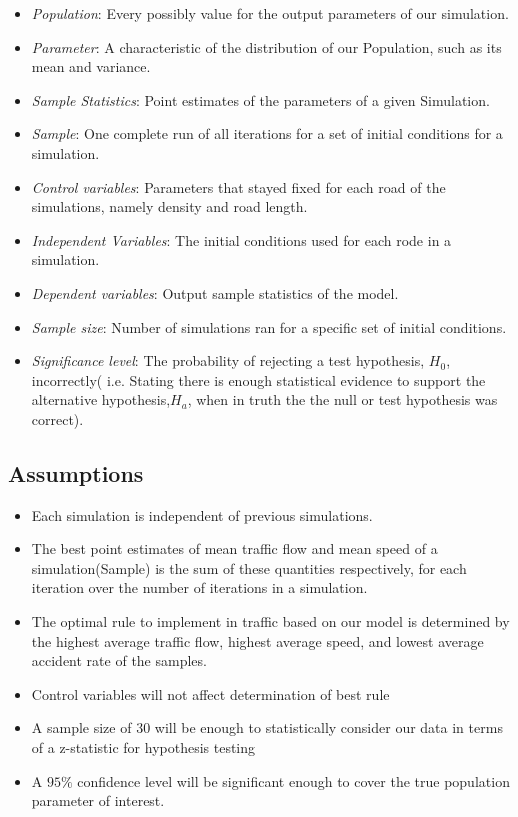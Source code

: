 \documentclass{amsart}
\begin{document}
	\begin{itemize}
		\item \textit{Population}: Every possibly value for the output parameters of our simulation.
		\item \textit{Parameter}: A characteristic of the distribution of our Population, such as its mean and variance.
		\item \textit{Sample Statistics}: Point estimates of the parameters of a given Simulation.
		\item \textit{Sample}: One complete run of all iterations for a set of initial conditions for a simulation.
		\item \textit{Control variables}: Parameters that stayed fixed for each road of the simulations, namely density and road length.
		\item \textit{Independent Variables}: The initial conditions used for each rode in a simulation.
		\item \textit{Dependent variables}:  Output sample statistics of the model.
		\item\textit{ Sample size}: Number of simulations ran for a specific set of initial conditions.
		\item \textit{Significance level}: The probability of rejecting a test hypothesis, $H_0$, incorrectly( i.e. Stating there is enough statistical evidence to support the alternative hypothesis,$H_a$, when in truth the the null or test hypothesis was correct). 
	
	\end{itemize}

	\subsection{Assumptions}
	\begin{itemize}
		\item Each simulation is independent of previous simulations.
		\item The best point estimates of mean traffic flow and mean speed of a simulation(Sample) is the sum of these quantities respectively, for each iteration over the number of iterations in a simulation.
		\item The optimal rule to implement in traffic based on our model is determined by the highest average traffic flow, highest average speed, and lowest average accident rate of the samples.
		\item Control variables will not affect determination of best rule
		\item A sample size of 30 will be enough to statistically consider our data in terms of a z-statistic for hypothesis testing
		\item A $95\%$ confidence level will be significant enough to cover the true population parameter of interest.
	\end{itemize}
	
\end{document}
